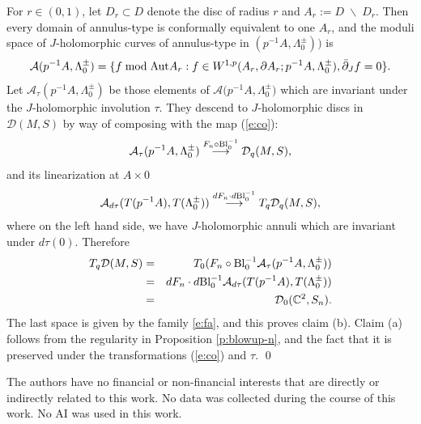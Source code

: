 \documentclass{amsart}
\newcommand{\bean}{\begin{eqnarray*}}
\newcommand{\eean}{\end{eqnarray*}}
\begin{document}
For $r\in (0,1)$, let $D_r \subset D$ denote the disc of radius $r$ and $A_r:= D \; \backslash \;D_r$. Then every domain of annulus-type is conformally equivalent to one  $A_r$, and the moduli space of $J$-holomorphic curves of annulus-type in $(p^{-1}A,\Lambda_0^{\pm}))$ is
\[
{\mathcal A}(p^{-1}A,\Lambda_0^{\pm})=\{
f {\rm\; mod\; Aut} A_r:f \in 
W^{1,p}(A_r,\partial A_r ; p^{-1}A,\Lambda_0^{\pm}), \bar\partial_{J}f=0 \}.
\]
Let ${\mathcal A}_\tau(p^{-1}A,\Lambda_0^{\pm})$ be those elements of 
${\mathcal A(p^{-1}A,}\Lambda_0^{\pm})$ 
which are invariant under the $J$-holomorphic involution $\tau$. They descend to $J$-holomorphic discs in ${\mathcal D}(M, S)$ by way of composing with  the map (\ref{e:co}): 
\[
{\mathcal A}_\tau(p^{-1}A,\Lambda_0^{\pm})  
\stackrel{F_n \circ {\rm Bl}_0^{-1}}
 \longrightarrow {\mathcal D}_q({M,S}),
\]
and its linearization at $A \times 0$
\[
{\mathcal A}_{d\tau}(T(p^{-1}A),T(\Lambda_0^{\pm})) \stackrel{d F_n \cdot d{\rm Bl}_0^{-1} } 
\longrightarrow T_ q {\mathcal D}_q(M,S),
\]
where on the left hand side, we have $J$-holomorphic annuli which are invariant under $d\tau(0)$. Therefore
\bean
T_ q {\mathcal D}(M,S) &=& T_0 (F_n \circ {\rm Bl}_0^{-1} {\mathcal A}_\tau (p^{-1}A,\Lambda_0^{\pm}))\cr
 &=& dF_n  \cdot d{\rm Bl}_0^{-1} {\mathcal A}_{d\tau}(T(p^{-1}A),T(\Lambda_0^{\pm})) \cr
 &=& {\mathcal D}_0(\mathbb{C}^2, S_n).
\eean
The last space is given by the family \eqref{e:fa}, and this proves claim (b). Claim (a) follows from the regularity in Proposition \ref{p:blowup-n}, and the fact that it is preserved under the transformations (\ref{e:co}) and $\tau$.
\qed


\vspace{0.2in}
 The authors have no financial or non-financial interests that are directly or indirectly related to this work. No data was collected during the course of this work. No AI was used in this work. 
\vspace{0.2in}
\end{document}
